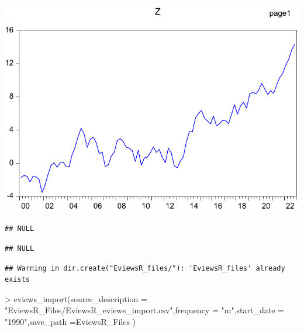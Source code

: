 \documentclass[
]{article}
\newenvironment{Shaded}{\begin{snugshade}}{\end{snugshade}}
\newcommand{\AttributeTok}[1]{\textcolor[rgb]{0.77,0.63,0.00}{#1}}
\newcommand{\FunctionTok}[1]{\textcolor[rgb]{0.00,0.00,0.00}{#1}}
\newcommand{\NormalTok}[1]{#1}
\newcommand{\SpecialCharTok}[1]{\textcolor[rgb]{0.00,0.00,0.00}{#1}}
\newcommand{\StringTok}[1]{\textcolor[rgb]{0.31,0.60,0.02}{#1}}
\begin{document}
\begin{center}\includegraphics{test_files/figure-latex//import-page1-GRAPH3} \end{center}

\begin{Shaded}
\end{Shaded}

\begin{verbatim}
## NULL
\end{verbatim}

\begin{Shaded}
\end{Shaded}

\begin{verbatim}
## NULL
\end{verbatim}

\begin{verbatim}
## Warning in dir.create("EviewsR_files/"): 'EviewsR_files' already exists
\end{verbatim}

\begin{Shaded}
\begin{Highlighting}[]
\SpecialCharTok{\textgreater{}} \FunctionTok{eviews\_import}\NormalTok{(}\AttributeTok{source\_description =} \StringTok{"EviewsR\_Files/EviewsR\_eviews\_import.csv"}\NormalTok{,}\AttributeTok{frequency =} \StringTok{"m"}\NormalTok{,}\AttributeTok{start\_date =} \StringTok{"1990"}\NormalTok{,}\AttributeTok{save\_path =}\StringTok{\textquotesingle{}EviewsR\_Files\textquotesingle{}}\NormalTok{ )}
\end{Highlighting}
\end{Shaded}
\end{document}
